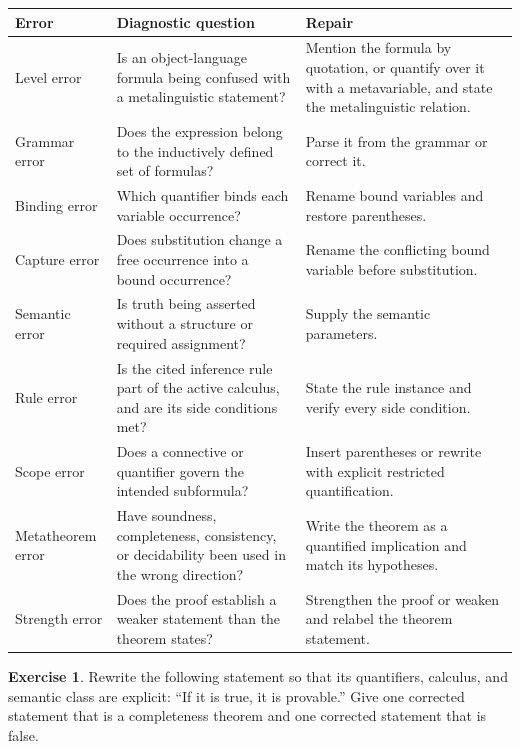 \documentclass[11pt,oneside,openany]{book}
\theoremstyle{definition}
\newtheorem{exercise}[definition]{Exercise}
\theoremstyle{plain}
\theoremstyle{remark}
\begin{document}
\begin{longtable}{@{}p{}p{}p{}@{}}
\toprule
Error & Diagnostic question & Repair \\
\midrule
\endhead
Level error & Is an object-language formula being confused with a
metalinguistic statement? & Mention the formula by quotation, or quantify
over it with a metavariable, and state the metalinguistic relation. \\
\addlinespace
Grammar error & Does the expression belong to the inductively defined set of
formulas? & Parse it from the grammar or correct it. \\
\addlinespace
Binding error & Which quantifier binds each variable occurrence? & Rename bound
variables and restore parentheses. \\
\addlinespace
Capture error & Does substitution change a free occurrence into a bound
occurrence? & Rename the conflicting bound variable before substitution. \\
\addlinespace
Semantic error & Is truth being asserted without a structure or required
assignment? & Supply the semantic parameters. \\
\addlinespace
Rule error & Is the cited inference rule part of the active calculus, and are
its side conditions met? & State the rule instance and verify every side
condition. \\
\addlinespace
Scope error & Does a connective or quantifier govern the intended subformula? &
Insert parentheses or rewrite with explicit restricted quantification. \\
\addlinespace
Metatheorem error & Have soundness, completeness, consistency, or decidability
been used in the wrong direction? & Write the theorem as a quantified
implication and match its hypotheses. \\
\addlinespace
Strength error & Does the proof establish a weaker statement than the theorem
states? & Strengthen the proof or weaken and relabel the theorem statement. \\
\bottomrule
\end{longtable}

\begin{exercise}
\label{ex:writing-foundations-01}
Rewrite the following statement so that its quantifiers, calculus, and semantic
class are explicit: ``If it is true, it is provable.''  Give one corrected
statement that is a completeness theorem and one corrected statement that is
false.
\end{exercise}
\end{document}

